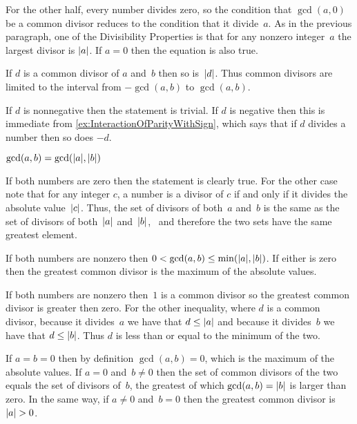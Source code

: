 \documentclass{ibl}  %
\begin{document}
\begin{problem}
\begin{exes}
\begin{answer}
  For the other half, 
  every number divides zero, so the condition that $\gcd(a,0)$ be a common
  divisor reduces to the condition that it divide~$a$.
  As in the previous paragraph, one of the Divisibility Properties  
  is that for any nonzero integer~$a$ the largest divisor is $\lvert a\rvert$.
  If $a=0$ then the equation is also true.  
\end{answer}
\begin{exercise} 
  If $d$ is a common divisor of $a$ and~$b$ then so is~$\lvert d\rvert$.
  Thus common divisors are limited to the interval from $-\gcd(a,b)$
  to $\gcd(a,b)$.
\end{exercise}
\begin{answer}
  If $d$ is nonnegative then the statement is trivial.
  If $d$ is negative then
  this is immediate from \ref{ex:InteractionOfParityWithSign},
  which says that if $d$ divides a number then so does $-d$.  
\end{answer}
\begin{exercise} 
  $\gcd(a,b)=\gcd(\lvert a\rvert,\lvert b\rvert)$
\end{exercise}
\begin{answer}
  If both numbers are zero then the statement is clearly true.
  For the other case note that for any
  integer $c$, a number is a divisor of $c$ if and only if it divides 
  the absolute value~$\lvert c\rvert$.
  Thus, the set of divisors of both~$a$ and~$b$ 
  is the same as the set of divisors of both~$\lvert a\rvert$ and~$\lvert b\rvert$, \
  and therefore the two sets have the same greatest element.  
\end{answer}
\begin{exercise}[\midlength] 
  If both numbers are nonzero then 
  $0< \gcd(a,b)\leq\min(\lvert a\rvert,\lvert b\rvert)$.
  If either is zero then the greatest common divisor is the 
  maximum of the absolute values.
\end{exercise}
\begin{answer}
  If both numbers are nonzero then~$1$ is a common divisor so 
  the greatest common divisor is greater then zero.
  For the other inequality,
  where $d$ is a common divisor, 
  because it divides~$a$ we have that $d\leq\lvert a\rvert$ and
  because it divides~$b$ we have that $d\leq\lvert b\rvert$.
  Thus $d$ is less than or equal to the minimum of the two.

  If $a=b=0$ then by definition $\gcd(a,b)=0$, 
  which is the maximum of the absolute values. 
  If $a=0$ and~$b\neq 0$ then the set of 
  common divisors of the two equals the set of divisors of~$b$, 
  the greatest of which $\gcd(a,b)=\lvert b\rvert$ is larger than zero.
  In the same way, if $a\neq 0$ and~$b=0$ then the greatest common divisor 
  is~$\lvert a\rvert>0$.
\end{answer}
\end{exes} 
\end{problem}
\end{document}
